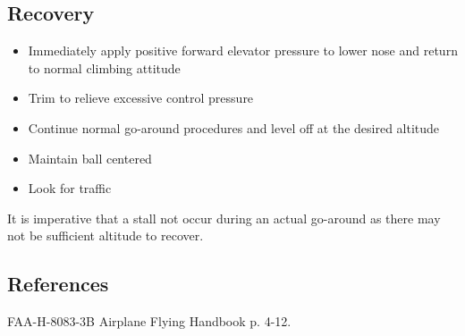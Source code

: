 \subsection{Recovery}

\begin{itemize}
  \item Immediately apply positive forward elevator pressure to lower nose and
    return to normal climbing attitude
  \item Trim to relieve excessive control pressure
  \item Continue normal go-around procedures and level off at the desired
    altitude 
  \item Maintain ball centered
  \item Look for traffic
\end{itemize}

It is imperative that a stall not occur during an actual go-around as there may
not be sufficient altitude to recover.

\subsection{References}
FAA-H-8083-3B Airplane Flying Handbook p. 4-12.

